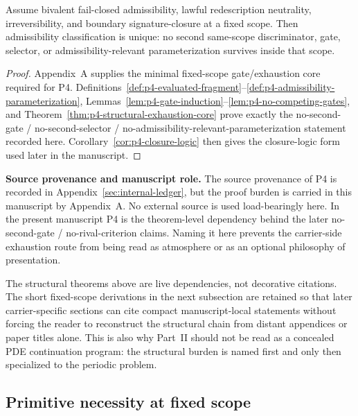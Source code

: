 \begin{manualtheorem}
\label{thm:imported-structural-exhaustion}
Assume bivalent fail-closed admissibility, lawful redescription neutrality, irreversibility, and boundary signature-closure at a fixed scope. Then admissibility classification is unique: no second same-scope discriminator, gate, selector, or admissibility-relevant parameterization survives inside that scope.
\end{manualtheorem}
\begin{proof}
Appendix~A supplies the minimal fixed-scope gate/exhaustion core required for P4. Definitions~\ref{def:p4-evaluated-fragment}--\ref{def:p4-admissibility-parameterization}, Lemmas~\ref{lem:p4-gate-induction}--\ref{lem:p4-no-competing-gates}, and Theorem~\ref{thm:p4-structural-exhaustion-core} prove exactly the no-second-gate / no-second-selector / no-admissibility-relevant-parameterization statement recorded here. Corollary~\ref{cor:p4-closure-logic} then gives the closure-logic form used later in the manuscript.
\end{proof}

\noindent\textbf{Source provenance and manuscript role.} The source provenance of P4 is recorded in Appendix~\ref{sec:internal-ledger}, but the proof burden is carried in this manuscript by Appendix~A. No external source is used load-bearingly here. In the present manuscript P4 is the theorem-level dependency behind the later no-second-gate / no-rival-criterion claims. Naming it here prevents the carrier-side exhaustion route from being read as atmosphere or as an optional philosophy of presentation.

\begin{remark}\label{rem:imported-packet-local-specialization}
The structural theorems above are live dependencies, not decorative citations. The short fixed-scope derivations in the next subsection are retained so that later carrier-specific sections can cite compact manuscript-local statements without forcing the reader to reconstruct the structural chain from distant appendices or paper titles alone. This is also why Part~II should not be read as a concealed PDE continuation program: the structural burden is named first and only then specialized to the periodic problem.
\end{remark}

\subsection{Primitive necessity at fixed scope}

